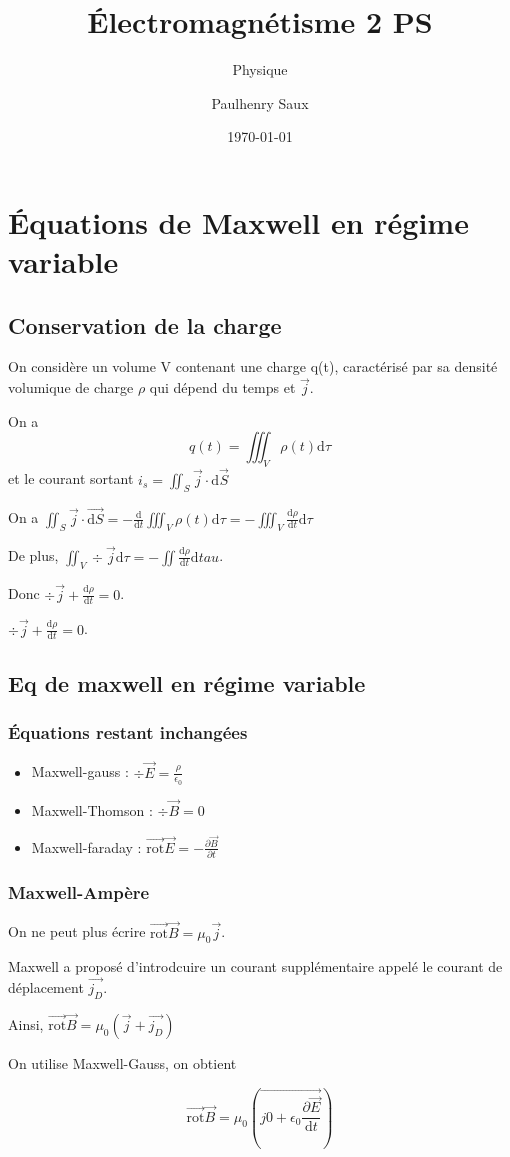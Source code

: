 \documentclass[french]{yLectureNote}
\title{Électromagnétisme 2 PS}
\subtitle{Physique}
\author{Paulhenry Saux}
\date{\today}
\renewcommand{\vec}{\overrightarrow}
\newcommand{\dd}{\mathrm{d}}
\newcommand{\rot}{\vec{\mathrm{rot}}}
\begin{document}
\chapter{Équations de Maxwell en régime variable}
\section{Conservation de la charge}
On considère un volume V contenant une charge q(t), caractérisé par sa densité volumique de charge $\rho$ qui dépend du temps et $\vec{j}$.

On a $$q(t) = \iiint_V \rho(t)\dd \tau$$ et le courant sortant $i_s = \iint_S \vec{j}\cdot\dd \vec{S}$

On a $\iint_S \vec{j}\cdot \vec{\dd S} = -\frac{\dd}{\dd t}\iiint_V\rho(t)\dd \tau = - \iiint_V \frac{\dd \rho}{\dd t}\dd \tau$

De plus, $\iint_V \div\vec{j}\dd \tau = -\iint \frac{\dd \rho}{\dd t}\dd tau$.

Donc $\div\vec{j}+\frac{\dd \rho}{\dd t}= 0$.
\begin{theorem}
    $\div\vec{j}+\frac{\dd \rho}{\dd t}= 0$.
\end{theorem}
\section{Eq de maxwell en régime variable}
\subsection{Équations restant inchangées}
\begin{itemize}
    \item Maxwell-gauss : $\div \vec{E} = \frac{\rho}{\epsilon_0}$
    \item Maxwell-Thomson : $\div\vec{B} = 0$
    \item Maxwell-faraday : $\rot\vec{E} = -\frac{\partial \vec{B}}{\partial t}$
\end{itemize}
\subsection{Maxwell-Ampère}
On ne peut plus écrire $ \rot\vec{B} = \mu_0\vec{j}$.

Maxwell a proposé d'introdcuire un courant supplémentaire appelé le courant de déplacement $\vec{j_D}$.

Ainsi, $\rot\vec{B} = \mu_0(\vec{j}+\vec{j_D})$

On utilise Maxwell-Gauss, on obtient
\begin{theorem}
    $$\rot\vec{B} = \mu_0(\vec{j0+\epsilon_0\frac{\partial \vec{E}}{\dd t}})$$
\end{theorem}
\end{document}
